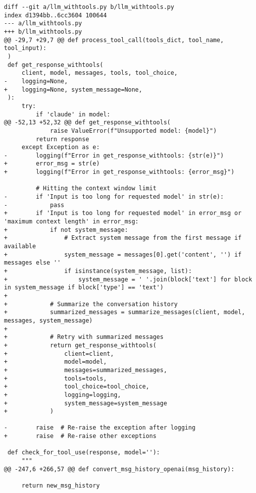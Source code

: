 \begin{lstlisting}[style=diffstyle]
diff --git a/llm_withtools.py b/llm_withtools.py
index d1394bb..6cc3604 100644
--- a/llm_withtools.py
+++ b/llm_withtools.py
@@ -29,7 +29,7 @@ def process_tool_call(tools_dict, tool_name, tool_input):
 )
 def get_response_withtools(
     client, model, messages, tools, tool_choice,
-    logging=None,
+    logging=None, system_message=None,
 ):
     try:
         if 'claude' in model:
@@ -52,13 +52,32 @@ def get_response_withtools(
             raise ValueError(f"Unsupported model: {model}")
         return response
     except Exception as e:
-        logging(f"Error in get_response_withtools: {str(e)}")
+        error_msg = str(e)
+        logging(f"Error in get_response_withtools: {error_msg}")
 
         # Hitting the context window limit
-        if 'Input is too long for requested model' in str(e):
-            pass
+        if 'Input is too long for requested model' in error_msg or 'maximum context length' in error_msg:
+            if not system_message:
+                # Extract system message from the first message if available
+                system_message = messages[0].get('content', '') if messages else ''
+                if isinstance(system_message, list):
+                    system_message = ' '.join(block['text'] for block in system_message if block['type'] == 'text')
+
+            # Summarize the conversation history
+            summarized_messages = summarize_messages(client, model, messages, system_message)
+            
+            # Retry with summarized messages
+            return get_response_withtools(
+                client=client,
+                model=model,
+                messages=summarized_messages,
+                tools=tools,
+                tool_choice=tool_choice,
+                logging=logging,
+                system_message=system_message
+            )
 
-        raise  # Re-raise the exception after logging
+        raise  # Re-raise other exceptions
 
 def check_for_tool_use(response, model=''):
     """
@@ -247,6 +266,57 @@ def convert_msg_history_openai(msg_history):
 
     return new_msg_history
 

\end{lstlisting}
